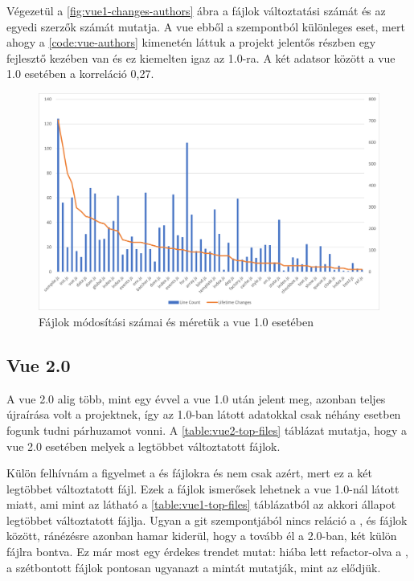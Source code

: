 Végezetül a \ref{fig:vue1-changes-authors} ábra a fájlok változtatási számát és az egyedi szerzők számát mutatja. A vue ebből a szempontból különleges eset, mert ahogy a \ref{code:vue-authors} kimenetén láttuk a projekt jelentős részben egy fejlesztő kezében van és ez kiemelten igaz az 1.0-ra. A két adatsor között a vue 1.0 esetében a korreláció 0,27.

\begin{figure}[H]
    \centering
    \includegraphics[width=1\textwidth]{images/vue/vue1-lines-lifetimechanges.png}
    \caption{Fájlok módosítási számai és méretük a vue 1.0 esetében}
    \label{fig:vue1-changes-lines}
\end{figure}

\pagebreak

\subsection{Vue 2.0}

A vue 2.0 alig több, mint egy évvel a vue 1.0 után jelent meg, azonban teljes újraírása volt a projektnek, így az 1.0-ban látott adatokkal csak néhány esetben fogunk tudni párhuzamot vonni. A \ref{table:vue2-top-files} táblázat mutatja, hogy a vue 2.0 esetében melyek a legtöbbet változtatott fájlok.

Külön felhívnám a figyelmet a  és  fájlokra és nem csak azért, mert ez a két legtöbbet változtatott fájl. Ezek a fájlok ismerősek lehetnek a vue 1.0-nál látott  miatt, ami mint az látható a \ref{table:vue1-top-files} táblázatból az akkori állapot legtöbbet változtatott fájlja. Ugyan a git szempontjából nincs reláció a ,  és  fájlok között, ránézésre azonban hamar kiderül, hogy a  tovább él a 2.0-ban, két külön fájlra bontva. Ez már most egy érdekes trendet mutat: hiába lett refactor-olva a , a szétbontott fájlok pontosan ugyanazt a mintát mutatják, mint az elődjük.

